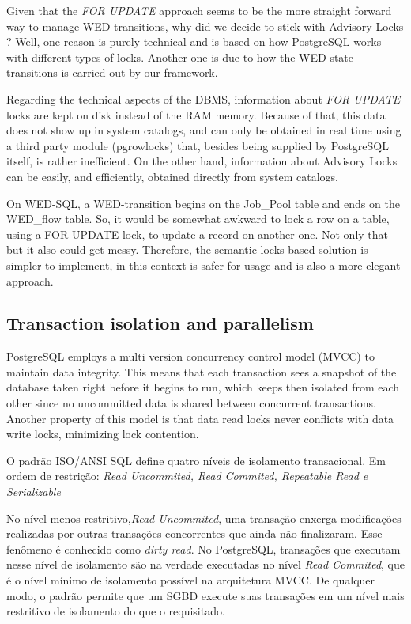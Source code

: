 \documentclass[conference]{IEEEtran}
\begin{document}
\par Given that the \emph{FOR UPDATE} approach seems to be the more straight forward way to manage WED-transitions, why
did we decide to stick with Advisory Locks ? Well, one reason is purely technical and is based on how PostgreSQL
works with different types of locks. Another one is due to how the WED-state transitions is carried out by our framework. 

\par Regarding the technical aspects of the DBMS, information about \emph{FOR UPDATE} locks are kept on disk instead of
the RAM memory. Because of that, this data does not show up in system catalogs, and can only be obtained in real time
using a third party module (pgrowlocks) that, besides being supplied by PostgreSQL itself, is rather inefficient. On the
other hand, information about Advisory Locks can be easily, and efficiently, obtained directly from system catalogs.  

\par On WED-SQL, a WED-transition begins on the Job\_Pool table and ends on the WED\_flow table. So, it would be somewhat
awkward to lock a row on a table, using a FOR UPDATE lock, to update a record on another one. Not only that but it also 
could get messy. Therefore, the semantic locks based solution is simpler to implement, in this context is safer for usage 
and is also a more elegant approach.   


\subsection{Transaction isolation and parallelism }

PostgreSQL employs a multi version concurrency control model (MVCC) to maintain data integrity. This means that each transaction
sees a snapshot of the database taken right before it begins to run, which keeps then isolated from each other since no uncommitted 
data is shared between concurrent transactions. Another property of this model is that data read locks never conflicts with
data write locks, minimizing lock contention.

\par O padrão ISO/ANSI SQL define quatro níveis de isolamento transacional. Em ordem de restrição: \emph{
Read Uncommited, Read Commited, Repeatable Read e Serializable}

\par No nível menos restritivo,\emph{Read Uncommited}, uma transação enxerga modificações realizadas por outras transações
concorrentes que ainda não finalizaram. Esse fenômeno é conhecido como \emph{dirty read}. No PostgreSQL, transações que executam
nesse nível de isolamento são na verdade executadas no nível \emph{Read Commited}, que é o nível mínimo de isolamento possível
na arquitetura MVCC. De qualquer modo, o padrão permite que um SGBD execute suas transações em um nível mais restritivo
de isolamento do que o requisitado.
\end{document}
